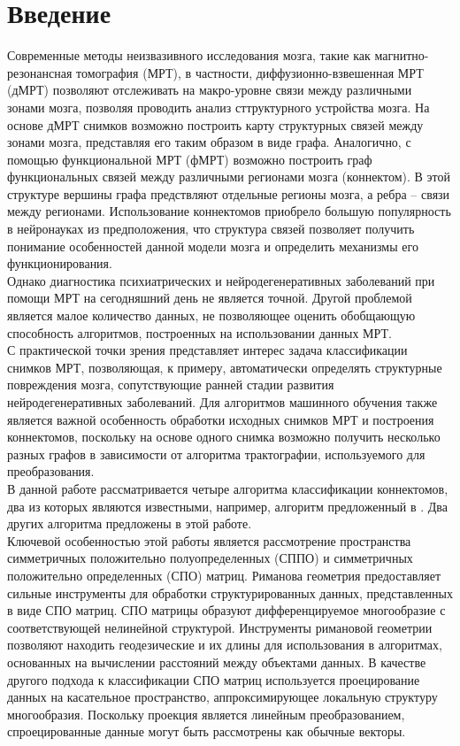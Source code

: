 \chapter{Введение}
\indent Современные методы неизвазивного исследования мозга, такие как магнитно-резонансная томография (МРТ), в частности, диффузионно-взвешенная МРТ (дМРТ) позволяют отслеживать на макро-уровне связи между различными зонами мозга, позволяя проводить анализ сттруктурного устройства мозга. На основе дМРТ снимков возможно построить карту структурных связей между зонами мозга, представляя его таким образом в виде графа. Аналогично, с помощью функциональной МРТ (фМРТ) возможно построить граф функциональных связей между различными регионами мозга (коннектом). В этой структуре вершины графа предствляют отдельные регионы мозга, а ребра – связи между регионами. Использование коннектомов приобрело большую популярность в нейронауках из предположения, что структура связей позволяет получить понимание особенностей данной модели мозга и определить механизмы его функционирования. \\
\indent Однако диагностика психиатрических и нейродегенеративных заболеваний при помощи МРТ на сегодняшний день не является точной. Другой проблемой является малое количество данных, не позволяющее оценить обобщающую способность алгоритмов, построенных на использовании данных МРТ. \\
\indent С практической точки зрения представляет интерес задача классификации снимков МРТ, позволяющая, к примеру, автоматически определять структурные повреждения мозга, сопутствующие ранней стадии развития нейродегенеративных заболеваний. Для алгоритмов машинного обучения также является важной особенность обработки исходных снимков МРТ и построения коннектомов, поскольку на основе одного снимка возможно получить несколько разных графов в зависимости от алгоритма трактографии, используемого для преобразования. \\
В данной работе рассматривается четыре алгоритма классификации коннектомов, два из которых являются известными, например, алгоритм предложенный в \cite{dodero2015kernel}. Два других алгоритма предложены в этой работе. \\ 
\indent Ключевой особенностью этой работы является рассмотрение пространства симметричных положительно полуопределенных (СППО) и симметричных положительно определенных (СПО) матриц. Риманова геометрия предоставляет сильные инструменты для обработки структурированных данных, представленных в виде СПО матриц. СПО матрицы образуют дифференцируемое многообразие с соответствующей нелинейной структурой. Инструменты римановой геометрии позволяют находить геодезические и их длины для использования в алгоритмах, основанных на вычислении расстояний между объектами данных. В качестве другого подхода к классификации СПО матриц используется проецирование данных на касательное пространство, аппроксимирующее локальную структуру многообразия. Поскольку проекция является линейным преобразованием, спроецированные данные могут быть рассмотрены как обычные векторы.\\
